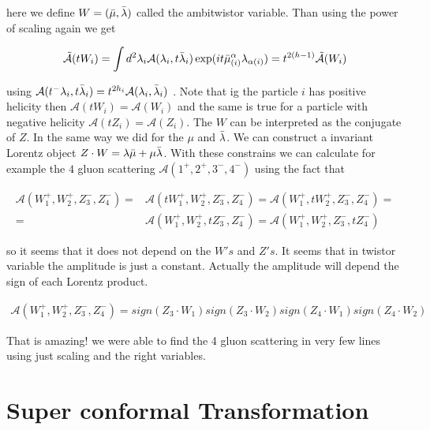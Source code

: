 here we define $W=(\bar{\mu},\bar{\lambda})$ called the ambitwistor variable. Than using the power of scaling again we get 

\begin{equation}
\tilde{\mathcal{A}}(tW_{i}) = \int d^{2}\lambda_{i}\mathcal{A}(\lambda_{i},t\bar{\lambda}_{i}) \exp(it\bar{\mu}^{\alpha}_{(i)}\lambda_{\alpha(i)})  = t^{2(h-1)}\tilde{\mathcal{A}}(W_{i})
\end{equation}

 using $\mathcal{A}(t^{-}\lambda_{i},t\bar{\lambda}_{i}) = t^{2h_{i}}\mathcal{A}(\lambda_{i},\bar{\lambda}_{i}) $ . Note that ig the particle $i$ has positive helicity then  $\mathcal{A}(tW_{i}) = \mathcal{A}(W_{i}) $ and the same is true for a particle with negative helicity $\mathcal{A}(tZ_{i}) = \mathcal{A}(Z_{i}) $.  
 The $W$ can be interpreted as the conjugate of $Z$. In the same way we did for the $\mu$ and $\bar{\lambda}$. We can construct a invariant Lorentz object $Z \cdot W = \lambda\bar{\mu} + \mu\bar{\lambda}$.
 With these constrains we can calculate for example the $4$ gluon scattering $\mathcal{A}(1^{+},2^{+},3^{-},4^{-})$ using the fact that 
 
 \begin{align}
 \mathcal{A}(W_{1}^{+},W_{2}^{+},Z_{3}^{-},Z_{4}^{-}) =&\nonumber \mathcal{A}(tW_{1}^{+},W_{2}^{+},Z_{3}^{-},Z_{4}^{-})=\mathcal{A}(W_{1}^{+},tW_{2}^{+},Z_{3}^{-},Z_{4}^{-})= \\ 
 =&\mathcal{A}(W_{1}^{+},W_{2}^{+},tZ_{3}^{-},Z_{4}^{-})=\mathcal{A}(W_{1}^{+},W_{2}^{+},Z_{3}^{-},tZ_{4}^{-})
 \end{align}

so it seems that it does not depend on the $W's$ and $Z's$. It seems that in twistor variable the amplitude is just a constant. Actually the amplitude will depend the sign of each Lorentz product. 

 \begin{align}
 \mathcal{A}(W_{1}^{+},W_{2}^{+},Z_{3}^{-},Z_{4}^{-}) = sign(Z_{3}\cdot W_{1})sign(Z_{3}\cdot W_{2})sign(Z_{4}\cdot W_{1})sign(Z_{4}\cdot W_{2})
 \end{align}


That is amazing! we were able to find the 4 gluon scattering in very few lines using just scaling and the right variables. 




\section{Super conformal Transformation}






